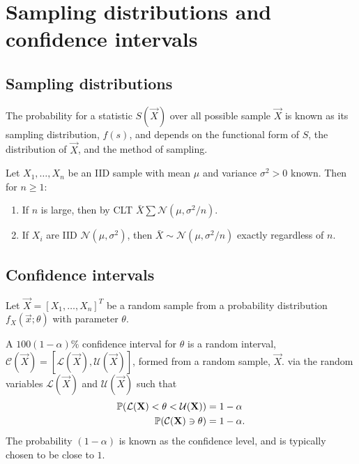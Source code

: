 \documentclass[10pt, a4paper]{article}
\begin{document}
\newpage

\section{Sampling distributions and confidence intervals}

\subsection{Sampling distributions}

\begin{definition}
    The probability for a statistic $S(\vec{X})$ over all possible sample $\vec{X}$ is known as its sampling distribution,
    $f(s)$,
    and depends on the functional form of $S$,
    the distribution of $\vec{X}$,
    and the method of sampling.
\end{definition}

\begin{proposition}
    Let $X_1, \dotsc, X_n$ be an IID sample with mean $\mu$ and variance $\sigma ^ 2 > 0$ known.
    Then for $n \geq 1$:
    \begin{enumerate}[label = (\roman*)]
        \item If $n$ is large,
        then by CLT $\bar{X} \sum \mathcal{N}(\mu, \sigma ^ 2 / n)$.

        \item If $X_i$ are IID $\mathcal{N}(\mu, \sigma ^ 2)$,
        then $\bar{X} \sim \mathcal{N}(\mu, \sigma ^ 2 / n)$ exactly regardless of $n$.
    \end{enumerate}
\end{proposition}

\subsection{Confidence intervals}
\begin{definition}
    Let $\vec{X} = [X_1, \dotsc, X_n] ^ T$ be a random sample from a probability distribution $f_{X}(\vec{x}; \theta)$ with parameter $\theta$.

    A $100(1 - \alpha)\%$ confidence interval for $\theta$ is a random interval,
    $\mathcal{C}(\vec{X}) = [\mathcal{L}(\vec{X}), \mathcal{U}(\vec{X})]$,
    formed from a random sample,
    $\vec{X}$.
    via the random variables $\mathcal{L}(\vec{X})$ and $\mathcal{U}(\vec{X})$ such that
    \begin{align*}
        \P(\mathcal{L}(\vec{X}) < \theta < \mathcal{U}(\vec{X})) &= 1 - \alpha \\
        \P(\mathcal{C}(\vec{X}) \ni \theta) &= 1 - \alpha.
    \end{align*}
    The probability $(1 - \alpha)$ is known as the confidence level,
    and is typically chosen to be close to $1$.
\end{definition}
\end{document}
